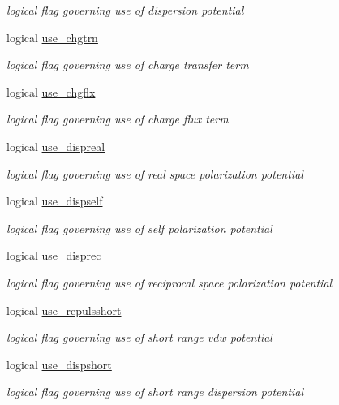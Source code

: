 \begin{DoxyCompactItemize}
\begin{DoxyCompactList}\small\item\em logical flag governing use of dispersion potential \end{DoxyCompactList}\item 
logical \hyperlink{classpotent_a427a66d48203d10bc98f3975007b9a49}{use\-\_\-chgtrn}
\begin{DoxyCompactList}\small\item\em logical flag governing use of charge transfer term \end{DoxyCompactList}\item 
logical \hyperlink{classpotent_affe1988d7557036700e8d5c8315e3431}{use\-\_\-chgflx}
\begin{DoxyCompactList}\small\item\em logical flag governing use of charge flux term \end{DoxyCompactList}\item 
logical \hyperlink{classpotent_a426f1334f3ae39238baec57dd741390c}{use\-\_\-dispreal}
\begin{DoxyCompactList}\small\item\em logical flag governing use of real space polarization potential \end{DoxyCompactList}\item 
logical \hyperlink{classpotent_a920b5aeadf8360f86eaad6ba489ad8f6}{use\-\_\-dispself}
\begin{DoxyCompactList}\small\item\em logical flag governing use of self polarization potential \end{DoxyCompactList}\item 
logical \hyperlink{classpotent_a54fc293e78c17bbe7755967bbc392b40}{use\-\_\-disprec}
\begin{DoxyCompactList}\small\item\em logical flag governing use of reciprocal space polarization potential \end{DoxyCompactList}\item 
logical \hyperlink{classpotent_aa509648794c36f8ebfd31d28635f55b4}{use\-\_\-repulsshort}
\begin{DoxyCompactList}\small\item\em logical flag governing use of short range vdw potential \end{DoxyCompactList}\item 
logical \hyperlink{classpotent_a3013529f621b1298195625556f78a72d}{use\-\_\-dispshort}
\begin{DoxyCompactList}\small\item\em logical flag governing use of short range dispersion potential \end{DoxyCompactList}\item 

\end{DoxyCompactItemize}
